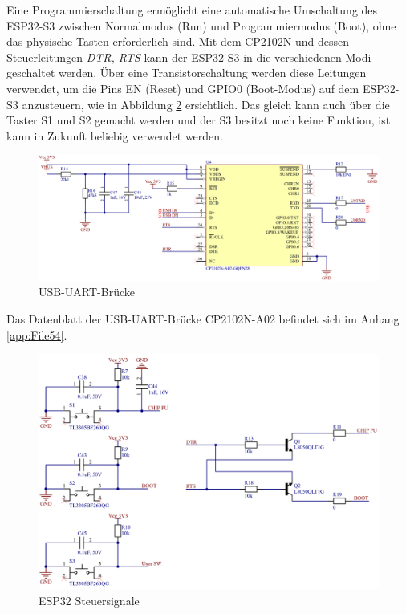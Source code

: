 Eine Programmierschaltung ermöglicht eine automatische Umschaltung des ESP32-S3 zwischen Normalmodus (Run) und Programmiermodus (Boot), ohne das physische Tasten erforderlich sind. Mit dem CP2102N und dessen Steuerleitungen \textit{DTR, RTS} kann der ESP32-S3 in die verschiedenen Modi geschaltet werden. Über eine Transistorschaltung werden diese Leitungen verwendet, um die Pins EN (Reset) und GPIO0 (Boot-Modus) auf dem ESP32-S3 anzusteuern, wie in Abbildung \ref{fig:ESP32_Steuersignale} ersichtlich. Das gleich kann auch über die Taster S1 und S2 gemacht werden und der S3 besitzt noch keine Funktion, ist kann in Zukunft beliebig verwendet werden.

\begin{figure}[H]
    \centering
    \includegraphics[width=1\linewidth]{Figures/Chap3/Schematics/UART_Bridge.png}
    \caption{USB-UART-Brücke}
    \label{fig:UART_Bridge}
\end{figure}

Das Datenblatt der USB-UART-Brücke CP2102N-A02 befindet sich im Anhang \ref{app:File54}.

\begin{figure}[H]
    \centering
    \includegraphics[width=1\linewidth]{Figures/Chap3/Schematics/ESP32_Steuersignale.png}
    \caption{ESP32 Steuersignale}
    \label{fig:ESP32_Steuersignale}
\end{figure}


